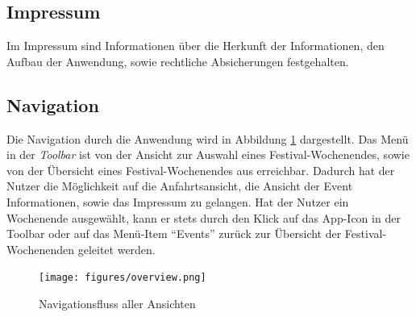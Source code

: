 \subsection{Impressum}
Im Impressum sind Informationen über die Herkunft der Informationen, den Aufbau der Anwendung, sowie rechtliche Absicherungen festgehalten.


\subsection{Navigation}
\label{sec:navigation}
Die Navigation durch die Anwendung wird in Abbildung \ref{fig:overview} dargestellt. Das Menü in der \textit{Toolbar} ist von der Ansicht zur Auswahl eines Festival-Wochenendes, sowie von der Übersicht eines Festival-Wochenendes aus erreichbar. Dadurch hat der Nutzer die Möglichkeit auf die Anfahrtsansicht, die Ansicht der Event Informationen, sowie das Impressum zu gelangen. Hat der Nutzer ein Wochenende ausgewählt, kann er stets durch den Klick auf das App-Icon in der Toolbar oder auf das Menü-Item "`Events"' zurück zur Übersicht der Festival-Wochenenden geleitet werden. 

\begin{figure}[p]
    \centering
        \texttt{[image: figures/overview.png]}
    \caption{Navigationsfluss aller Ansichten}
    \label{fig:overview}
\end{figure}
